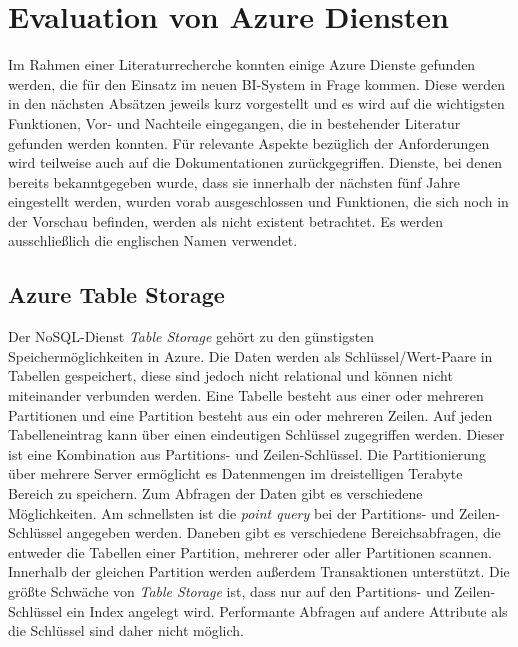 \section{Evaluation von Azure Diensten} \label{sec:evaluation}
Im Rahmen einer Literaturrecherche konnten einige Azure Dienste gefunden werden, die für den Einsatz im neuen BI-System in Frage kommen. Diese werden in den nächsten Absätzen jeweils kurz vorgestellt und es wird auf die wichtigsten Funktionen, Vor- und Nachteile eingegangen, die in bestehender Literatur gefunden werden konnten. Für relevante Aspekte bezüglich der Anforderungen wird teilweise auch auf die Dokumentationen zurückgegriffen. Dienste, bei denen bereits bekanntgegeben wurde, dass sie innerhalb der nächsten fünf Jahre eingestellt werden, wurden vorab ausgeschlossen und Funktionen, die sich noch in der Vorschau befinden, werden als nicht existent betrachtet. Es werden ausschließlich die englischen Namen verwendet.

\subsection{Azure Table Storage} \label{sec:grundlagen:azure_dienste:tableStorage}
Der NoSQL-Dienst \textit{Table Storage} gehört zu den günstigsten Speichermöglichkeiten in Azure. Die Daten werden als Schlüssel/Wert-Paare in Tabellen gespeichert, diese sind jedoch nicht relational und können nicht miteinander verbunden werden. Eine Tabelle besteht aus einer oder mehreren Partitionen und eine Partition besteht aus ein oder mehreren Zeilen. Auf jeden Tabelleneintrag kann über einen eindeutigen Schlüssel zugegriffen werden. Dieser ist eine Kombination aus Partitions- und Zeilen-Schlüssel. Die Partitionierung über mehrere Server ermöglicht es Datenmengen im dreistelligen Terabyte Bereich zu speichern. Zum Abfragen der Daten gibt es verschiedene Möglichkeiten. Am schnellsten ist die \textit{point query} bei der Partitions- und Zeilen-Schlüssel angegeben werden. Daneben gibt es verschiedene Bereichsabfragen, die entweder die Tabellen einer Partition, mehrerer oder aller Partitionen scannen. Innerhalb der gleichen Partition werden außerdem Transaktionen unterstützt. Die größte Schwäche von \textit{Table Storage} ist, dass nur auf den Partitions- und Zeilen-Schlüssel ein Index angelegt wird. Performante Abfragen auf andere Attribute als die Schlüssel sind daher nicht möglich. 

